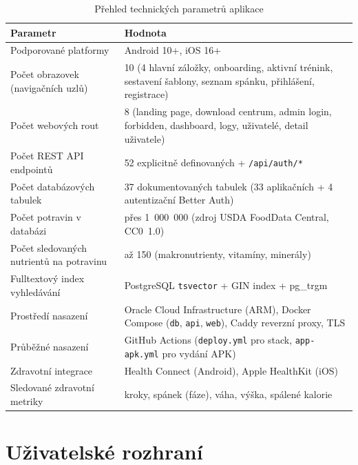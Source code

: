 \begin{table}[H]
  \centering
  \caption{Přehled technických parametrů aplikace}
  \label{tab:technicke-parametry}
  \begin{tabularx}{\textwidth}{|p{6.5cm}|L|}
    \hline
    \textbf{Parametr} & \textbf{Hodnota} \\
    \hline
    Podporované platformy
      & Android 10+, iOS 16+ \\
    \hline
    Počet obrazovek (navigačních uzlů)
      & 10 (4 hlavní záložky, onboarding, aktivní trénink,
        sestavení šablony, seznam spánku, přihlášení, registrace) \\
    \hline
    Počet webových rout
      & 8 (landing page, download centrum, admin login,
        forbidden, dashboard, logy, uživatelé, detail uživatele) \\
    \hline
    Počet REST API endpointů
      & 52 explicitně definovaných + \texttt{/api/auth/*} \\
    \hline
    Počet databázových tabulek
      & 37 dokumentovaných tabulek (33 aplikačních + 4 autentizační Better Auth) \\
    \hline
    Počet potravin v databázi
      & přes 1~000~000 (zdroj USDA FoodData Central, CC0~1.0) \\
    \hline
    Počet sledovaných nutrientů na potravinu
      & až 150 (makronutrienty, vitamíny, minerály) \\
    \hline
    Fulltextový index vyhledávání
      & PostgreSQL \texttt{tsvector} + GIN index + pg\_trgm \\
    \hline
    Prostředí nasazení
      & Oracle Cloud Infrastructure (ARM),
        Docker Compose (\texttt{db}, \texttt{api}, \texttt{web}),
        Caddy reverzní proxy, TLS \\
    \hline
    Průběžné nasazení
      & GitHub Actions (\texttt{deploy.yml} pro stack,
        \texttt{app-apk.yml} pro vydání APK) \\
    \hline
    Zdravotní integrace
      & Health Connect (Android), Apple HealthKit (iOS) \\
    \hline
    Sledované zdravotní metriky
      & kroky, spánek (fáze), váha, výška, spálené kalorie \\
    \hline
  \end{tabularx}
\end{table}

\section{Uživatelské rozhraní}


